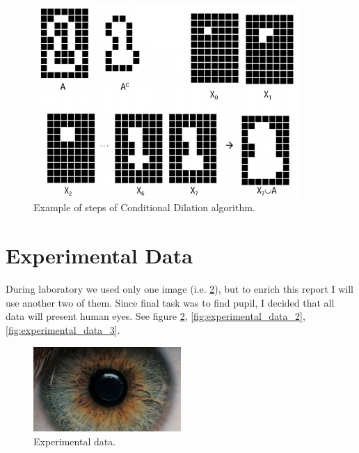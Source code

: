 \documentclass{article}
\begin{document}
\begin{description}
\begin{figure}[H]
	\centering
	\includegraphics[width=0.9\textwidth]{_Figures/code/conditional_example.jpg}
    \caption{Example of steps of Conditional Dilation algorithm.}
    \label{fig:conditional_dilation_example}
\end{figure}



\end{description} 
\pagebreak
 

\section{Experimental Data} \label{experimental_data}
During laboratory we used only one image (i.e. \ref{fig:experimental_data_1}), but to enrich this report I will use another two of them. Since final task was to find pupil, I decided that all data will present human eyes. See figure \ref{fig:experimental_data_1}, \ref{fig:experimental_data_2}, \ref{fig:experimental_data_3}.

\begin{figure}[H]
\centering
\includegraphics[width=0.5\textwidth]{_Figures/raw_data_1.jpg}\hfill
\caption{Experimental data.}
\label{fig:experimental_data_1}
\end{figure}
\end{document}
